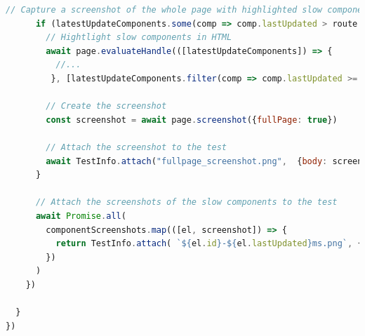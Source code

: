 \documentclass[a4paper, 10pt]{article}
\begin{document}
\begin{lstlisting}[caption={Test file for component load times}, label={lst:dynamic-performance-spec}, language=JavaScript, escapechar=°]
      // Capture a screenshot of the whole page with highlighted slow components
      if (latestUpdateComponents.some(comp => comp.lastUpdated > route.pageLoadBudgetMs)){
        // Hightlight slow components in HTML
        await page.evaluateHandle(([latestUpdateComponents]) => {
          //...
         }, [latestUpdateComponents.filter(comp => comp.lastUpdated >= route.pageLoadBudgetMs)])

        // Create the screenshot
        const screenshot = await page.screenshot({fullPage: true})

        // Attach the screenshot to the test
        await TestInfo.attach("fullpage_screenshot.png",  {body: screenshot, contentType: 'image/png'})
      }

      // Attach the screenshots of the slow components to the test
      await Promise.all(
        componentScreenshots.map(([el, screenshot]) => {
          return TestInfo.attach( `${el.id}-${el.lastUpdated}ms.png`, {body: screenshot, contentType: 'image/png'})
        })
      )
    })

  }
})
\end{lstlisting}
\end{document}
